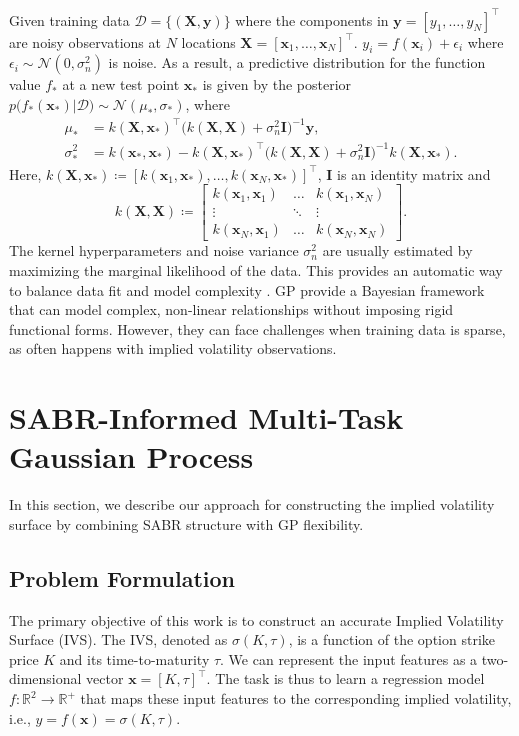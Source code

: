 \documentclass[preprint,12pt]{elsarticle}
\begin{document}
Given training data $\mathcal{D}=\{(\mathbf{X,y})\}$ where the components in $\mathbf{y}=[y_{1},\dots,y_{N}]^{\intercal}$ are noisy observations at $N$ locations $\mathbf{X}=[\mathbf{x}_{1},\dots,\mathbf{x}_{N}]^{\intercal}$. $y_i = f(\mathbf{x}_i) + \epsilon_i$ where $\epsilon_i \sim \mathcal{N}(0, \sigma_n^2)$ is noise. As a result, a predictive distribution for the function value $f_\ast$ at a new test point $\mathbf{x}_\ast$ is given by the posterior $p\big(f_{\ast}(\mathbf{x}_\ast)|\mathcal{D}\big)\sim\mathcal{N}(\mu_\ast,\sigma_\ast)$, where
\begin{align}
    \mu_\ast &= k(\mathbf{X,x_\ast})^\intercal \big(k(\mathbf{X,X}) + \sigma_n^2 \mathbf{I}\big)^{-1} \mathbf{y} ,\\
    \sigma_\ast^2 &= k(\mathbf{x}_\ast, \mathbf{x}_\ast) - k(\mathbf{X,x_\ast})^\intercal \big(k(\mathbf{X,X}) + \sigma_n^2 \mathbf{I}\big)^{-1} k(\mathbf{X,x_\ast}).
\end{align}
Here, $k(\mathbf{X,x_\ast})\coloneqq\left[k(\mathbf x_1, \mathbf{x_\ast}),\dots,k(\mathbf x_N, \mathbf{x_\ast})\right]^\intercal$,  $\mathbf{I}$ is an identity matrix and $$k(\mathbf{X,X})\coloneqq
\begin{bmatrix}
    k(\mathbf x_1, \mathbf x_1)& \dots & k(\mathbf x_1, \mathbf x_N)\\
    \vdots & \ddots & \vdots \\
    k(\mathbf x_N, \mathbf x_1)& \dots & k(\mathbf x_N, \mathbf x_N)
\end{bmatrix}.$$
The kernel hyperparameters and noise variance $\sigma_n^2$ are usually estimated by maximizing the marginal likelihood of the data. This provides an automatic way to balance data fit and model complexity \citep{rasmussen2000occam}. GP provide a Bayesian framework that can model complex, non-linear relationships without imposing rigid functional forms. However, they can face challenges when training data is sparse, as often happens with implied volatility observations.

\section{SABR-Informed Multi-Task Gaussian Process} \label{sec:methodology}


In this section, we describe our approach for constructing the implied volatility surface by combining SABR structure with GP flexibility.

\subsection{Problem Formulation}
The primary objective of this work is to construct an accurate Implied Volatility Surface (IVS). The IVS, denoted as $\sigma(K, \tau)$, is a function of the option strike price $K$ and its time-to-maturity $\tau$. We can represent the input features as a two-dimensional vector $\mathbf{x} = [K, \tau]^\intercal$. The task is thus to learn a regression model $f: \mathbb{R}^2 \to \mathbb{R}^+$ that maps these input features to the corresponding implied volatility, i.e., $y = f(\mathbf{x}) = \sigma(K, \tau)$.
\end{document}
